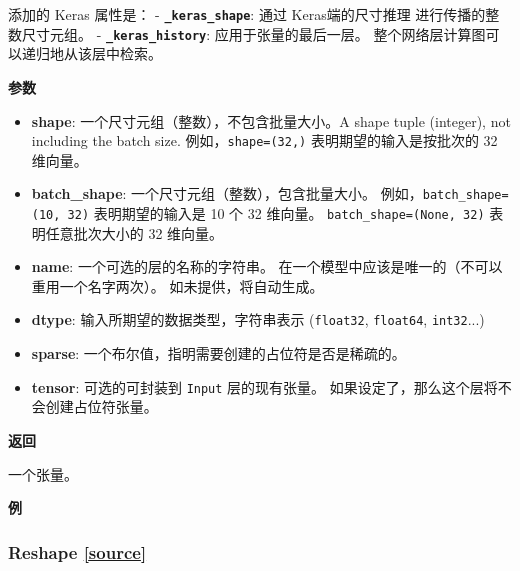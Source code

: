 添加的 Keras 属性是： - \textbf{\texttt{\_keras\_shape}}: 通过
Keras端的尺寸推理 进行传播的整数尺寸元组。 -
\textbf{\texttt{\_keras\_history}}: 应用于张量的最后一层。
整个网络层计算图可以递归地从该层中检索。

\textbf{参数}

\begin{itemize}
\tightlist
\item
  \textbf{shape}: 一个尺寸元组（整数），不包含批量大小。A shape tuple
  (integer), not including the batch size. 例如，\texttt{shape=(32,)}
  表明期望的输入是按批次的 32 维向量。
\item
  \textbf{batch\_shape}: 一个尺寸元组（整数），包含批量大小。
  例如，\texttt{batch\_shape=(10,\ 32)} 表明期望的输入是 10 个 32
  维向量。 \texttt{batch\_shape=(None,\ 32)} 表明任意批次大小的 32
  维向量。
\item
  \textbf{name}: 一个可选的层的名称的字符串。
  在一个模型中应该是唯一的（不可以重用一个名字两次）。
  如未提供，将自动生成。
\item
  \textbf{dtype}: 输入所期望的数据类型，字符串表示 (\texttt{float32},
  \texttt{float64}, \texttt{int32}...)
\item
  \textbf{sparse}: 一个布尔值，指明需要创建的占位符是否是稀疏的。
\item
  \textbf{tensor}: 可选的可封装到 \texttt{Input} 层的现有张量。
  如果设定了，那么这个层将不会创建占位符张量。
\end{itemize}

\textbf{返回}

一个张量。

\textbf{例}

\begin{Shaded}
\begin{Highlighting}[]
\OperatorTok{=} \OperatorTok{=}\NormalTok{(}\NormalTok{,))}
\OperatorTok{=} \OperatorTok{=}
\OperatorTok{=} 
\end{Highlighting}
\end{Shaded}


\subsubsection{Reshape {\href{https://github.com/keras-team/keras/blob/master/keras/layers/core.py\#L314}{{[}source{]}}}}

